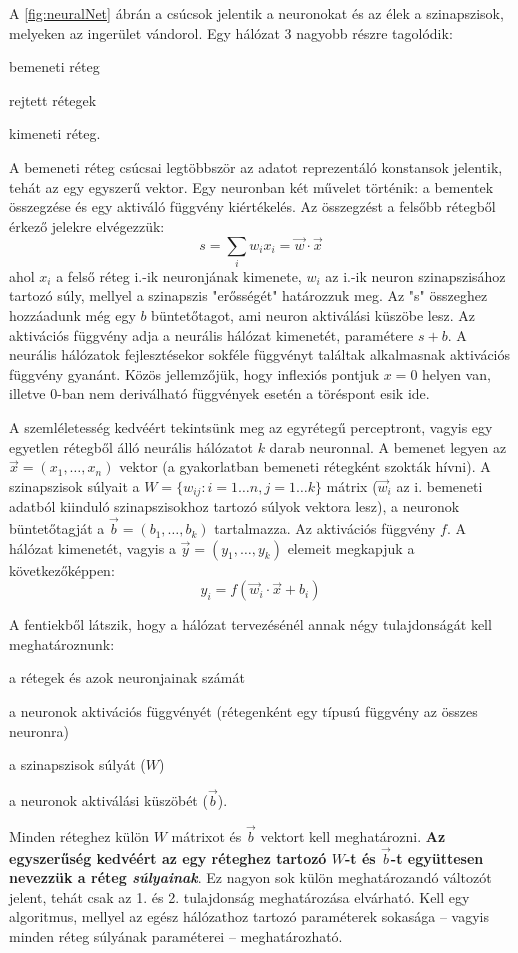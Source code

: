 A \ref{fig:neuralNet} ábrán a csúcsok jelentik a neuronokat és az élek a szinapszisok, melyeken az ingerület vándorol. Egy hálózat 3 nagyobb részre tagolódik:
\begin{enumerate*}[label={\alph*)},font=\bfseries]
	\item bemeneti réteg
	\item rejtett rétegek
	\item kimeneti réteg.
\end{enumerate*}
A bemeneti réteg csúcsai legtöbbször az adatot reprezentáló konstansok jelentik, tehát az egy egyszerű vektor.
Egy neuronban két művelet történik: a bementek összegzése és egy aktiváló függvény kiértékelés. Az összegzést a felsőbb rétegből érkező jelekre elvégezzük:
\begin{displaymath}
	s = \sum_i{w_ix_i} = \vec{w}\cdot\vec{x}
\end{displaymath}
ahol $x_i$ a felső réteg i.-ik neuronjának kimenete, $w_i$ az i.-ik neuron szinapszisához tartozó súly, mellyel a szinapszis "erősségét" határozzuk meg. Az "s" összeghez hozzáadunk még egy $b$  büntetőtagot, ami neuron aktiválási küszöbe lesz.
Az aktivációs függvény adja a neurális hálózat kimenetét, paramétere $s+b$.
A neurális hálózatok fejlesztésekor sokféle függvényt találtak alkalmasnak aktivációs függvény gyanánt. Közös jellemzőjük, hogy inflexiós pontjuk $x=0$ helyen van, illetve 0-ban nem deriválható függvények esetén a töréspont esik ide.

A szemléletesség kedvéért tekintsünk meg az egyrétegű perceptront, vagyis egy egyetlen rétegből álló neurális hálózatot $k$ darab neuronnal. A bemenet legyen az $\vec{x}=(x_1,\dots,x_n)$ vektor (a gyakorlatban bemeneti rétegként szokták hívni). A szinapszisok súlyait a $W=\{w_{ij}:i=1\dots n,j=1\dots k\}$  mátrix ($\vec{w}_i$ az i. bemeneti adatból kiinduló szinapszisokhoz tartozó súlyok vektora lesz), a neuronok  büntetőtagját a $\vec{b}=(b_1,\dots,b_k)$ tartalmazza. Az aktivációs függvény $f$. A hálózat kimenetét, vagyis a  $\vec{y}=(y_1,\dots,y_k)$ elemeit megkapjuk a következőképpen:
\begin{displaymath}
	y_i = f(\vec{w}_i\cdot\vec{x}+b_i)
\end{displaymath}

A fentiekből látszik, hogy a hálózat tervezésénél annak négy tulajdonságát kell meghatároznunk:
\begin{enumerate*}
	\item a rétegek és azok neuronjainak számát
	\item a neuronok aktivációs függvényét (rétegenként egy típusú függvény az összes neuronra)
	\item a szinapszisok súlyát ($W$)
	\item a neuronok aktiválási küszöbét ($\vec{b}$).
\end{enumerate*}
Minden réteghez külön $W$ mátrixot és $\vec{b}$ vektort kell meghatározni. \textbf{Az egyszerűség kedvéért az egy réteghez tartozó $W$-t és $\vec{b}$-t együttesen nevezzük a réteg \emph{súlyainak}}. Ez nagyon sok külön meghatározandó változót jelent, tehát csak az 1. és 2. tulajdonság meghatározása elvárható. Kell egy algoritmus, mellyel az egész hálózathoz tartozó paraméterek sokasága -- vagyis minden réteg súlyának paraméterei -- meghatározható.


